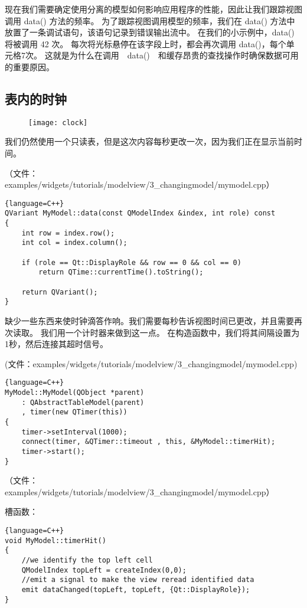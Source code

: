 现在我们需要确定使用分离的模型如何影响应用程序的性能，因此让我们跟踪视图调用 data() 方法的频率。
为了跟踪视图调用模型的频率，我们在 data() 方法中放置了一条调试语句，该语句记录到错误输出流中。
在我们的小示例中，data() 将被调用 42 次。
每次将光标悬停在该字段上时，都会再次调用 data()，每个单元格7次。
这就是为什么在调用　data()　和缓存昂贵的查找操作时确保数据可用的重要原因。

\subsection{表内的时钟}

\begin{figure}[hbt!]  
\texttt{[image: clock]}
\end{figure}

我们仍然使用一个只读表，但是这次内容每秒更改一次，因为我们正在显示当前时间。

（文件：examples/widgets/tutorials/modelview/3\_changingmodel/mymodel.cpp）

\begin{lstlisting}{language=C++}
QVariant MyModel::data(const QModelIndex &index, int role) const
{
    int row = index.row();
    int col = index.column();

    if (role == Qt::DisplayRole && row == 0 && col == 0)
        return QTime::currentTime().toString();

    return QVariant();
}
\end{lstlisting}

缺少一些东西来使时钟滴答作响。我们需要每秒告诉视图时间已更改，并且需要再次读取。
我们用一个计时器来做到这一点。
在构造函数中，我们将其间隔设置为1秒，然后连接其超时信号。

(文件：examples/widgets/tutorials/modelview/3\_changingmodel/mymodel.cpp)

\begin{lstlisting}{language=C++}
MyModel::MyModel(QObject *parent)
    : QAbstractTableModel(parent)
    , timer(new QTimer(this))
{
    timer->setInterval(1000);
    connect(timer, &QTimer::timeout , this, &MyModel::timerHit);
    timer->start();
}
\end{lstlisting}

（文件：examples/widgets/tutorials/modelview/3\_changingmodel/mymodel.cpp）

槽函数：

\begin{lstlisting}{language=C++}
void MyModel::timerHit()
{
    //we identify the top left cell
    QModelIndex topLeft = createIndex(0,0);
    //emit a signal to make the view reread identified data
    emit dataChanged(topLeft, topLeft, {Qt::DisplayRole});
}
\end{lstlisting}

